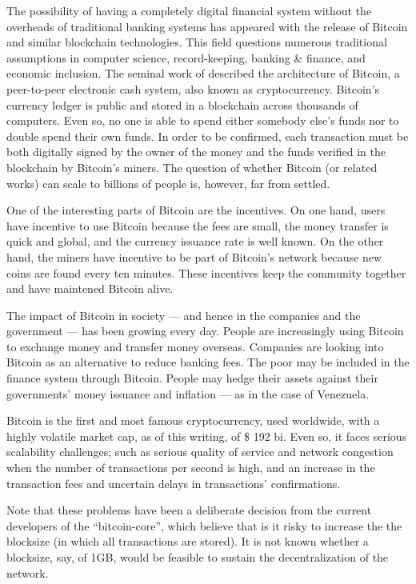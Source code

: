 The possibility of having a completely digital financial system without the overheads of traditional banking systems has appeared with the release of Bitcoin and similar blockchain technologies.  This field questions numerous traditional assumptions in computer science, record-keeping, banking \& finance, and economic inclusion. The seminal work of \citet{nakamoto2008bitcoin} described the architecture of Bitcoin, a peer-to-peer electronic cash system, also known as cryptocurrency. Bitcoin's currency ledger is public and stored in a blockchain across thousands of computers. Even so, no one is able to spend either somebody else's funds nor to double spend their own funds. In order to be confirmed, each transaction must be both digitally signed by the owner of the money and the funds verified in the blockchain by Bitcoin's miners. The question of whether Bitcoin (or related works) can scale to billions of people is, however, far from settled.

One of the interesting parts of Bitcoin are the incentives. On one hand, users have incentive to use Bitcoin because the fees are small, the money transfer is quick and global, and the currency issuance rate is well known. On the other hand, the miners have incentive to be part of Bitcoin's network because new coins are found every ten minutes. These incentives keep the community together and have maintened Bitcoin alive.

The impact of Bitcoin in society --- and hence in the companies and the government --- has been growing every day. People are increasingly using Bitcoin to exchange money and transfer money overseas. Companies are looking into Bitcoin as an alternative to reduce banking fees. The poor may be included in the finance system through Bitcoin. People may hedge their assets against their governments' money issuance and inflation --- as in the case of Venezuela.

Bitcoin is the first and most famous cryptocurrency, used worldwide, with a highly volatile market cap, as of this writing, of \$ 192 bi. Even so, it faces serious scalability challenges; such as serious quality of service and network congestion when the number of transactions per second is high, and an increase in the transaction fees and uncertain delays in transactions' confirmations.

Note that these problems have been a deliberate decision from the current developers of the ``bitcoin-core'', which believe that is it risky to increase the the blocksize (in which all transactions are stored).  It is not known whether a blocksize, say, of 1GB, would be feasible to sustain the decentralization of the network.

